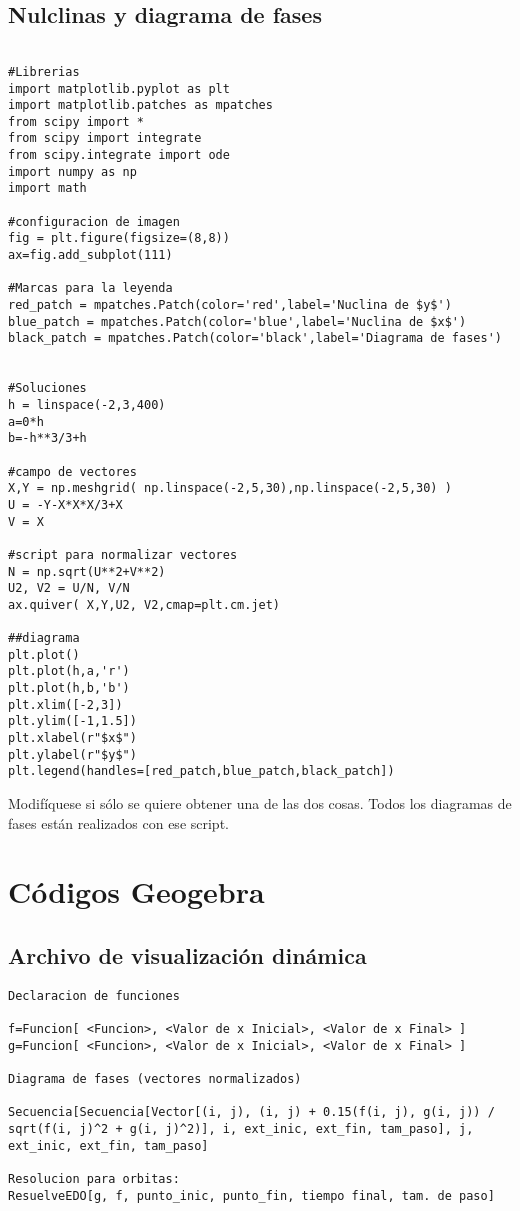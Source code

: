 \documentclass[a4paper,12pt,twoside]{report}
\begin{document}
\section{Nulclinas y diagrama de fases}
\begin{lstlisting}

#Librerias
import matplotlib.pyplot as plt
import matplotlib.patches as mpatches
from scipy import *
from scipy import integrate
from scipy.integrate import ode
import numpy as np
import math

#configuracion de imagen
fig = plt.figure(figsize=(8,8))
ax=fig.add_subplot(111)

#Marcas para la leyenda
red_patch = mpatches.Patch(color='red',label='Nuclina de $y$')
blue_patch = mpatches.Patch(color='blue',label='Nuclina de $x$')
black_patch = mpatches.Patch(color='black',label='Diagrama de fases')


#Soluciones
h = linspace(-2,3,400)
a=0*h
b=-h**3/3+h

#campo de vectores
X,Y = np.meshgrid( np.linspace(-2,5,30),np.linspace(-2,5,30) )
U = -Y-X*X*X/3+X
V = X

#script para normalizar vectores
N = np.sqrt(U**2+V**2)  
U2, V2 = U/N, V/N
ax.quiver( X,Y,U2, V2,cmap=plt.cm.jet)

##diagrama 
plt.plot()
plt.plot(h,a,'r')
plt.plot(h,b,'b')
plt.xlim([-2,3])
plt.ylim([-1,1.5])
plt.xlabel(r"$x$")
plt.ylabel(r"$y$")
plt.legend(handles=[red_patch,blue_patch,black_patch])
\end{lstlisting}
Modifíquese si sólo se quiere obtener una de las dos cosas. Todos los diagramas de fases están realizados con ese script.

\chapter{Códigos Geogebra}\label{aped.C}
\section{Archivo de visualización dinámica}
\begin{lstlisting}
Declaracion de funciones

f=Funcion[ <Funcion>, <Valor de x Inicial>, <Valor de x Final> ]
g=Funcion[ <Funcion>, <Valor de x Inicial>, <Valor de x Final> ]

Diagrama de fases (vectores normalizados)

Secuencia[Secuencia[Vector[(i, j), (i, j) + 0.15(f(i, j), g(i, j)) / sqrt(f(i, j)^2 + g(i, j)^2)], i, ext_inic, ext_fin, tam_paso], j, ext_inic, ext_fin, tam_paso]

Resolucion para orbitas:
ResuelveEDO[g, f, punto_inic, punto_fin, tiempo final, tam. de paso]


\end{lstlisting}



\end{document}

